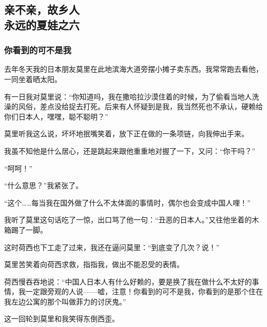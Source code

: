 \subsection{亲不亲，故乡人\\\small{永远的夏娃之六}}

\subsubsection*{你看到的可不是我}
\par 去年冬天我的日本朋友莫里在此地滨海大道旁摆小摊子卖东西。我常常跑去看他，一同坐着晒太阳。
\par 有一日我对莫里说：“你知道吗，我在撒哈拉沙漠住着的时候，为了偷看当地人洗澡的风俗，差点没给捉去打死。后来有人怀疑到是我，我当然死也不承认，硬赖给你们日本人，嘿嘿，聪不聪明？”
\par 莫里听我这么说，坏坏地抿嘴笑着，放下正在做的一条项链，向我伸出手来。
\par 我虽不知他是什么居心，还是跳起来跟他重重地对握了一下，又问：“你干吗？”
\par “呵呵！”
\par “什么意思？”我紧张了。
\par “这个……每当我在国外做了什么不太体面的事情时，偶尔也会变成中国人哩！”
\par 我听了莫里这句话吃了一惊，出口骂了他一句：“丑恶的日本人。”又往他坐着的木箱踢了一脚。
\par 这时荷西也下工走了过来，我还在逼问莫里：“到底变了几次？说！”
\par 莫里苦笑着向荷西求救，指指我，做出不能忍受的表情。
\par 荷西慢吞吞地说：“中国人日本人有什么好赖的，要是换了我在做什么不太好的事情，我一定跟旁观的人说——嘘，注意！你看到的可不是我，你看到的是那个住在我左边公寓的那个叫做菲力的讨厌鬼。”
\par 这一回轮到莫里和我笑得东倒西歪。
